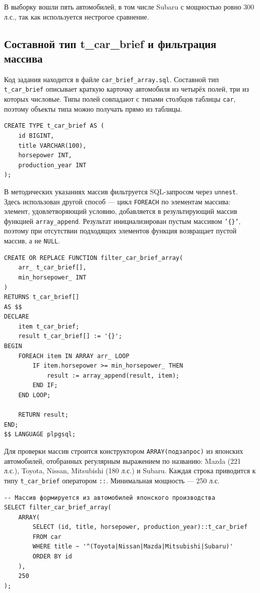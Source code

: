 \documentclass[oneside,a4paper,14pt]{extarticle}
\begin{document}
В выборку вошли пять автомобилей, в том числе Subaru с мощностью ровно 300 л.с., так как используется нестрогое сравнение.

\subsection{Составной тип t\_car\_brief и фильтрация массива}

Код задания находится в файле \texttt{car\_brief\_array.sql}. Составной тип \texttt{t\_car\_brief} описывает краткую карточку автомобиля из четырёх полей, три из которых числовые. Типы полей совпадают с типами столбцов таблицы \texttt{car}, поэтому объекты типа можно получать прямо из таблицы.

\begin{verbatim}
CREATE TYPE t_car_brief AS (
    id BIGINT,
    title VARCHAR(100),
    horsepower INT,
    production_year INT
);
\end{verbatim}

В методических указаниях массив фильтруется SQL-запросом через \texttt{unnest}. Здесь использован другой способ --- цикл \texttt{FOREACH} по элементам массива: элемент, удовлетворяющий условию, добавляется в результирующий массив функцией \texttt{array\_append}. Результат инициализирован пустым массивом \texttt{'\{\}'}, поэтому при отсутствии подходящих элементов функция возвращает пустой массив, а не \texttt{NULL}.

\begin{verbatim}
CREATE OR REPLACE FUNCTION filter_car_brief_array(
    arr_ t_car_brief[],
    min_horsepower_ INT
)
RETURNS t_car_brief[]
AS $$
DECLARE
    item t_car_brief;
    result t_car_brief[] := '{}';
BEGIN
    FOREACH item IN ARRAY arr_ LOOP
        IF item.horsepower >= min_horsepower_ THEN
            result := array_append(result, item);
        END IF;
    END LOOP;

    RETURN result;
END;
$$ LANGUAGE plpgsql;
\end{verbatim}

Для проверки массив строится конструктором \texttt{ARRAY(подзапрос)} из японских автомобилей, отобранных регулярным выражением по названию: Mazda (221 л.с.), Toyota, Nissan, Mitsubishi (180 л.с.) и Subaru. Каждая строка приводится к типу \texttt{t\_car\_brief} оператором \texttt{::}. Минимальная мощность --- 250 л.с.

\begin{verbatim}
-- Массив формируется из автомобилей японского производства
SELECT filter_car_brief_array(
    ARRAY(
        SELECT (id, title, horsepower, production_year)::t_car_brief
        FROM car
        WHERE title ~ '^(Toyota|Nissan|Mazda|Mitsubishi|Subaru)'
        ORDER BY id
    ),
    250
);
\end{verbatim}
\end{document}
